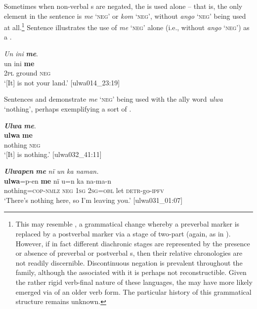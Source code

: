   Sometimes when  non-verbal s are negated, the  is used alone -- that is, the only  element in the sentence is \textit{me} ‘\textsc{neg’} or \textit{kom} ‘\textsc{neg’}, without \textit{ango} ‘\textsc{neg’} being used at all.\footnote{This may resemble  \citep{Dahl1979}, a  grammatical change whereby a preverbal  marker is replaced by a postverbal  marker via a stage of two-part  (again, as in ). However, if in fact different diachronic stages are represented by the presence or absence of preverbal or postverbal s, then their relative chronologies are not readily discernible. Discontinuous negation  is prevalent throughout the  family, although the  associated with it is perhaps not reconstructible. Given the rather rigid verb-final nature of these languages, the  may have more likely emerged via  of an older verb form. The particular history of this grammatical structure remains unknown. } Sentence  illustrates the use of \textit{me} ‘\textsc{neg}’ alone (i.e., without \textit{ango} ‘\textsc{neg’}) as a .

\ea%
    \label{ex:syntax:155}
          \textit{Un ini} \textbf{\textit{me}}.\\
\gll un  ini    \textbf{me}\\
    2\textsc{pl}  ground  \textsc{neg}\\
\glt `[It] is not your land.’ [ulwa014\_23:19]
\z

Sentences  and  demonstrate \textit{me} ‘\textsc{neg}’ being used with the ally  word \textit{ulwa} ‘nothing’, perhaps exemplifying a sort of .

\ea%
    \label{ex:syntax:156}
          \textbf{\textit{Ulwa}} \textbf{\textit{me}}.\\
\gll \textbf{ulwa}    \textbf{me}\\
    nothing  \textsc{neg}\\
\glt `[It] is nothing.’ [ulwa032\_41:11]
\z



\ea%
    \label{ex:syntax:157}
          \textbf{\textit{Ulwapen}} \textbf{\textit{me}} \textit{nï un ka naman.}\\
\gll    \textbf{ulwa}=p-en        \textbf{me}    nï    u=n    ka  na-ma-n\\
    nothing=\textsc{cop{}-nmlz}  \textsc{neg}  \textsc{1sg}  \textsc{2sg=obl} let  \textsc{detr-}go-\textsc{ipfv}\\
\glt `There’s nothing here, so I’m leaving you.’ [ulwa031\_01:07]
\z

